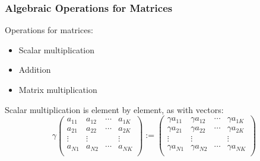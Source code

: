 \begin{frame}
    \frametitle{Algebraic Operations for Matrices}

    \vspace{2em}
    Operations for matrices:
    
    \begin{itemize}
        \item Scalar multiplication 
        \item Addition
        \item Matrix multiplication
    \end{itemize}
    
    \vspace{.7em}
    Scalar multiplication is element by element, as with vectors:
    \begin{equation*}
        \gamma 
        \left(
        \begin{array}{cccc}
            a_{11} & a_{12} & \cdots & a_{1K} \\
            a_{21} & a_{22} & \cdots & a_{2K} \\
            \vdots & \vdots &  & \vdots \\
            a_{N1} & a_{N2} & \cdots & a_{NK} \\
        \end{array}
        \right)
        :=
        \left(
        \begin{array}{cccc}
            \gamma a_{11} & \gamma a_{12} & \cdots & \gamma a_{1K} \\
            \gamma a_{21} & \gamma a_{22} & \cdots & \gamma a_{2K} \\
            \vdots & \vdots &  & \vdots \\
            \gamma a_{N1} & \gamma a_{N2} & \cdots & \gamma a_{NK} \\
        \end{array}
        \right)
    \end{equation*}

\end{frame}

